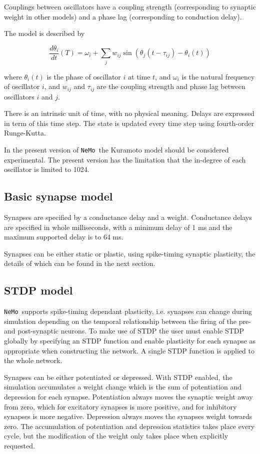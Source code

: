 \documentclass[a4paper]{article}
\newcommand{\nemo}{\texttt{NeMo}}
\begin{document}
Couplings between oscillators have a coupling strength (corresponding to synaptic weight in other models) and a phase lag (corresponding to conduction delay).

The model is described by

\[
\frac{d\theta_i}{dt}(T) = \omega_i + \sum_{j} w_{ij} \sin(\theta_j(t-\tau_{ij}) - \theta_i(t)) 
\]

where
	$\theta_i(t)$ is the phase of oscillator $i$ at time $t$,
	and $\omega_i$ is the natural frequency of oscillator $i$, and
	$w_{ij}$ and $\tau_{ij}$ are the coupling strength and phase lag between oscillators $i$ and $j$.

There is an intrinsic unit of time, with no physical meaning.
Delays are expressed in term of this time step.
The state is updated every time step using fourth-order Runge-Kutta.

In the present version of \nemo\ the Kuramoto model should be considered experimental.
The present version has the limitation that the in-degree of each oscillator is limited to 1024.

\subsection{Basic synapse model}
\label{model:synapse}

Synapses are specified by a conductance delay and a weight.
Conductance delays are specified in whole milliseconds, 
	with a minimum delay of 1 ms
	and the maximum supported delay is to 64 ms.

Synapses can be either static or plastic,
	using spike-timing synaptic plasticity,
	the details of which can be found in the next section.

\subsection{STDP model}
\label{model:stdp}

\nemo\ supports spike-timing dependant plasticity,
	i.e. synapses can change during simulation depending on the temporal relationship 
between the firing of the pre- and post-synaptic neurons. 
To make use of STDP the user must enable STDP globally by specifying an STDP function
	and enable plasticity for each synapse as appropriate when constructing the network.
A single STDP function is applied to the whole network.

Synapses can be either potentiated or depressed.
With STDP enabled,
	the simulation accumulates a weight change
	which is the sum of potentiation and depression for each synapse. 
Potentiation always moves the synaptic weight away from zero,
	which for excitatory synapses is more positive,
	and for inhibitory synapses is more negative.
Depression always moves the synapses weight towards zero.
The accumulation of potentiation and depression statistics takes place every cycle,
	but the modification of the weight only takes place when explicitly requested.
\end{document}
